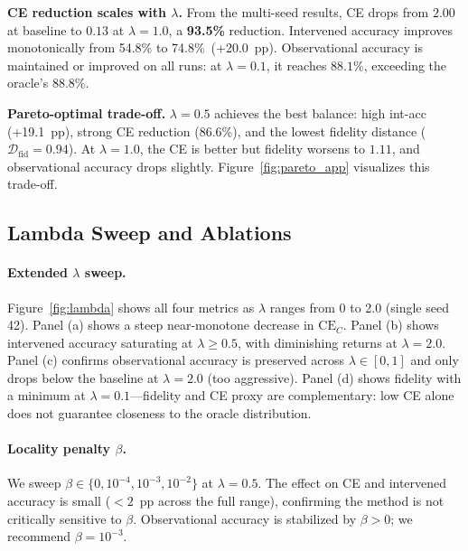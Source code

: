 \documentclass{article}
\newcommand{\CE}{\mathrm{CE}}
\newcommand{\Dfid}{\mathcal{D}_{\mathrm{fid}}}
\begin{document}
\textbf{CE reduction scales with $\lambda$.}  From the multi-seed results, CE
drops from $2.00$ at baseline to $0.13$ at $\lambda{=}1.0$, a \textbf{93.5\%}
reduction.  Intervened accuracy improves monotonically from 54.8\% to
74.8\%~(+20.0~pp).  Observational accuracy is maintained or improved on all
runs: at $\lambda{=}0.1$, it reaches $88.1\%$, exceeding the oracle's $88.8\%$.

\textbf{Pareto-optimal trade-off.}  $\lambda{=}0.5$ achieves the best balance:
high int-acc (+19.1~pp), strong CE reduction (86.6\%), and the lowest fidelity
distance ($\Dfid{=}0.94$).  At $\lambda{=}1.0$, the CE is better but fidelity
worsens to $1.11$, and observational accuracy drops slightly.  Figure~\ref{fig:pareto_app}
visualizes this trade-off.

\subsection{Lambda Sweep and Ablations}
\label{subsec:ablations}

\paragraph{Extended $\lambda$ sweep.}
Figure~\ref{fig:lambda} shows all four metrics as $\lambda$ ranges from 0 to
2.0 (single seed 42).  Panel (a) shows a steep near-monotone decrease in
$\CE_C$.  Panel (b) shows intervened accuracy saturating at $\lambda \geq 0.5$,
with diminishing returns at $\lambda{=}2.0$.  Panel (c) confirms observational
accuracy is preserved across $\lambda \in [0, 1]$ and only drops below the
baseline at $\lambda{=}2.0$ (too aggressive).  Panel (d) shows fidelity with
a minimum at $\lambda{=}0.1$—fidelity and CE proxy are complementary: low CE
alone does not guarantee closeness to the oracle distribution.

\paragraph{Locality penalty $\beta$.}
We sweep $\beta \in \{0, 10^{-4}, 10^{-3}, 10^{-2}\}$ at $\lambda{=}0.5$.
The effect on CE and intervened accuracy is small ($<2$~pp across the full
range), confirming the method is not critically sensitive to $\beta$.
Observational accuracy is stabilized by $\beta > 0$; we recommend $\beta{=}10^{-3}$.
\end{document}
